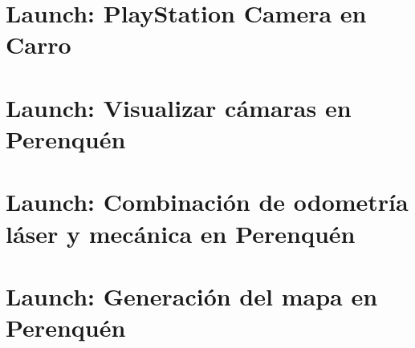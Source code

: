 
\section{Launch: PlayStation Camera en Carro}
\label{appendix:carrito}


\section{Launch: Visualizar cámaras en Perenquén }
\label{appendix:stereo}


\section{Launch: Combinación de odometría láser y mecánica en Perenquén}
\label{appendix:sensors}


\section{Launch: Generación del mapa en Perenquén}
\label{appendix:mapping}


